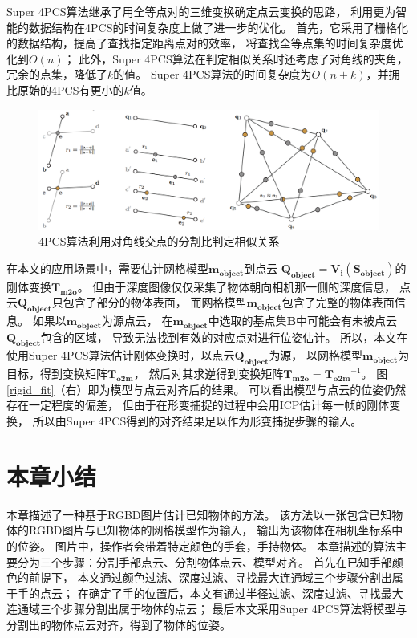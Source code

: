 Super 4PCS算法继承了用全等点对的三维变换确定点云变换的思路，
利用更为智能的数据结构在4PCS的时间复杂度上做了进一步的优化。
首先，它采用了栅格化的数据结构，提高了查找指定距离点对的效率，
将查找全等点集的时间复杂度优化到$O(n)$；
此外，Super 4PCS算法在判定相似关系时还考虑了对角线的夹角，
冗余的点集，降低了$k$的值。
Super 4PCS算法的时间复杂度为$O(n+k)$，并拥比原始的4PCS有更小的$k$值。
\begin{figure}
    \centering
    \includegraphics[width = \textwidth]{./Pictures/4PCS.png}
    \caption{4PCS算法利用对角线交点的分割比判定相似关系}
    \label{4pcs}
\end{figure}

在本文的应用场景中，需要估计网格模型$\bm{m_{object}}$到点云
$\bm{Q_{object}} = \bm{V_i}(\bm{S_{object}})$的刚体变换$\bm{T_{m2o}}$。
但由于深度图像仅仅采集了物体朝向相机那一侧的深度信息，
点云$\bm{Q_{object}}$只包含了部分的物体表面，
而网格模型$\bm{m_{object}}$包含了完整的物体表面信息。
如果以$\bm{m_{object}}$为源点云，
在$\bm{m_{object}}$中选取的基点集$\bm{B}$中可能会有未被点云$\bm{Q_{object}}$包含的区域，
导致无法找到有效的对应点对进行位姿估计。
所以，本文在使用Super 4PCS算法估计刚体变换时，以点云$\bm{Q_{object}}$为源，
以网格模型$\bm{m_{object}}$为目标，得到变换矩阵$\bm{T_{o2m}}$，
然后对其求逆得到变换矩阵${\bm{T_{m2o}}=\bm{T_{o2m}}}^{-1}$。
图\ref{rigid_fit}（右）即为模型与点云对齐后的结果。
可以看出模型与点云的位姿仍然存在一定程度的偏差，
但由于在形变捕捉的过程中会用ICP估计每一帧的刚体变换，
所以由Super 4PCS得到的对齐结果足以作为形变捕捉步骤的输入。
\section{本章小结}
本章描述了一种基于RGBD图片估计已知物体的方法。
该方法以一张包含已知物体的RGBD图片与已知物体的网格模型作为输入，
输出为该物体在相机坐标系中的位姿。
图片中，操作者会带着特定颜色的手套，手持物体。
本章描述的算法主要分为三个步骤：分割手部点云、分割物体点云、模型对齐。
首先在已知手部颜色的前提下，
本文通过颜色过滤、深度过滤、寻找最大连通域三个步骤分割出属于手的点云；
在确定了手的位置后，本文有通过半径过滤、深度过滤、寻找最大连通域三个步骤分割出属于物体的点云；
最后本文采用Super 4PCS算法将模型与分割出的物体点云对齐，得到了物体的位姿。

